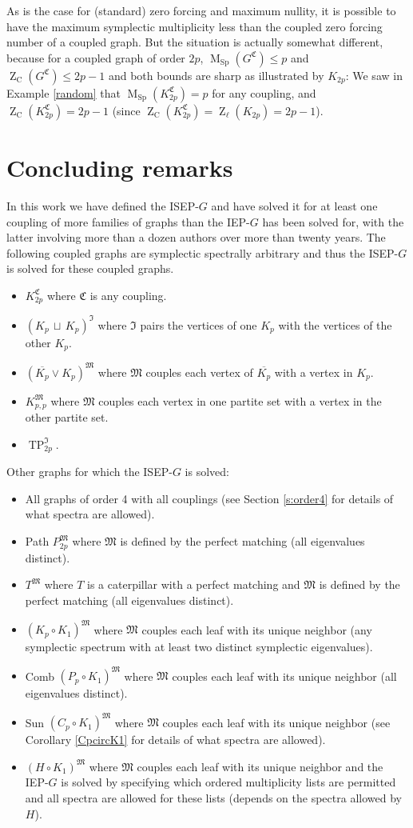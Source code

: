 \documentclass[12pt]{article}
\theoremstyle{definition}
\theoremstyle{definition}
\theoremstyle{definition}
\numberwithin{figure}{section}
\numberwithin{equation}{section}
\newcommand{\GC}[2]{#1 ^ {\mathfrak #2}}
\newcommand{\PP}{\mathfrak{C}}
\newcommand{\MM}{\mathfrak{M}}
\newcommand{\II}{\mathfrak{I}}
\newcommand{\tp}{\operatorname{TP}}
\newcommand{\Z}{\operatorname{Z}}
\newcommand{\ZC}{\Z_{\operatorname{C}}}
\newcommand{\Zell}{\Z_{\ell}}
\newcommand{\M}{\operatorname{M}}
\newcommand{\MC}{\M_{\operatorname{Sp}}}
\newcommand{\bit}{\begin{itemize}}
\newcommand{\eit}{\end{itemize}}
\newcommand{\OL}{\overline}
\newcommand{\du}{\mathbin{\,\sqcup\,}}
\begin{document}
As is the case for (standard)  zero forcing and  maximum nullity, it is possible to have the maximum symplectic multiplicity less than the coupled zero forcing number of a coupled graph.  But the situation is actually somewhat different, because for a coupled graph of order $2p$,  $\MC(\GC G C)\le p$ and $\ZC(\GC G C)\le 2p-1$ {and both bounds are sharp as illustrated by $K_{2p}$: We saw in Example \ref{random} that $\MC(K_{2p}^\PP)=p$ for any coupling, and} $\ZC(\GC {K_{2p}} C)= 2p-1$ (since $ {\ZC(\GC {K_{2p}} C)=\Zell(K_{2p})=} 2p-1$).  

 \section{Concluding remarks}\label{s:conclude}
In this work we have defined the ISEP-$G$ and have solved it for at least one coupling of more families of graphs than the IEP-$G$ has been solved for, with the latter involving more than a dozen authors over more than twenty years.
The following coupled graphs are symplectic spectrally arbitrary and thus the ISEP-$G$ is solved for these coupled graphs.
\bit
\item $K_{2p}^\PP$ where $\PP$ is any coupling.
\item $(K_p\du K_p)^\II$  where $\II$ pairs the vertices of one $K_p$ with the vertices of the other $K_p$.
\item $(\OL{K_p}\vee K_p)^\MM$ where $\MM$ couples each vertex of $\OL{K_p}$ with a vertex in $K_p$.
\item $K_{p,p}^\MM$  where $\MM$ couples each vertex in one partite set with a vertex in the other partite set.
\item $\tp_{2p}^\II$. 
\eit 
Other graphs for which the ISEP-$G$ is solved: 
\bit
\item All graphs of order 4  with all couplings (see Section \ref{s:order4} for details of what spectra are allowed).
\item Path $P_{2p}^\MM$ where $\MM$ is defined by the perfect matching (all eigenvalues distinct).
\item $T^\MM$ where  $T$ is a caterpillar with a perfect matching  and $\MM$ is defined by the perfect matching  (all eigenvalues distinct).
\item  $(K_p\circ K_1)^\MM$ where $\MM$  couples each leaf with its unique neighbor (any symplectic spectrum with at least two distinct symplectic eigenvalues).
\item Comb $(P_p\circ K_1)^\MM$ where $\MM$  couples each leaf with its unique neighbor (all eigenvalues distinct).
\item Sun $(C_p\circ K_1)^\MM$ where $\MM$  couples each leaf with its unique neighbor (see Corollary \ref{CpcircK1} for details of what spectra are allowed).
\item $(H\circ K_1)^\MM$ where $\MM$  couples each leaf with its unique neighbor and the IEP-$G$ is solved by specifying which ordered multiplicity lists are permitted and all spectra are allowed for these lists (depends on the spectra allowed by $H$).
\eit
\end{document}
